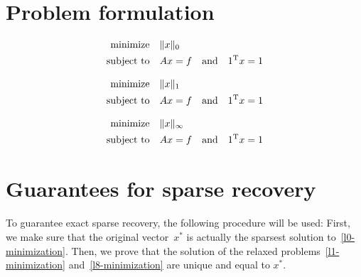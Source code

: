 \documentclass{article} %
\begin{document}
\section{Problem formulation}
\begin{equation}\label{l0-minimization}
  \begin{split}
    \text{minimize} &\quad \lVert x\rVert_0\\
    \text{subject to} &\quad Ax = f\quad\text{and}\quad 1^{\rm T} x = 1
  \end{split}
\end{equation}

\begin{equation}\label{l1-minimization}
  \begin{split}
    \text{minimize} &\quad \lVert x\rVert_1\\
    \text{subject to} &\quad Ax = f\quad\text{and}\quad 1^{\rm T} x = 1
  \end{split}
\end{equation}

\begin{equation}\label{l8-minimization}
  \begin{split}
    \text{minimize} &\quad \lVert x\rVert_\infty\\
    \text{subject to} &\quad Ax = f\quad\text{and}\quad 1^{\rm T} x = 1
  \end{split}
\end{equation}
\section{Guarantees for sparse recovery}
To guarantee exact sparse recovery, the following procedure will be used: First, we make sure that the original vector~$x^*$ is actually the sparsest solution to~\eqref{l0-minimization}. Then, we prove that the solution of the relaxed problems~\eqref{l1-minimization} and~\eqref{l8-minimization} are unique and equal to $x^*$.
\end{document}

